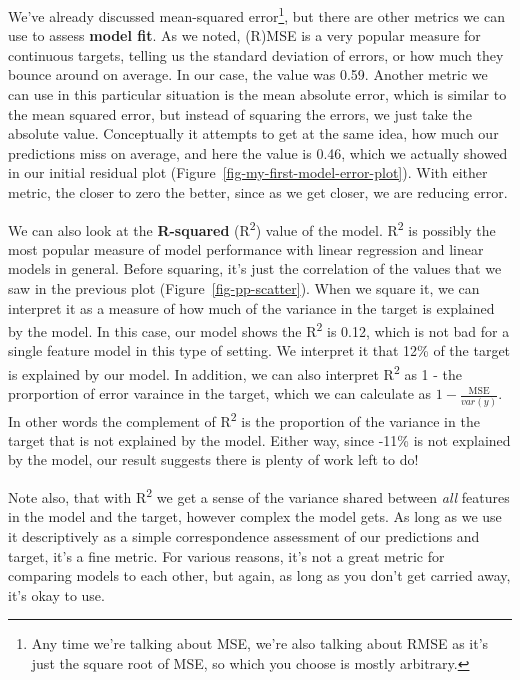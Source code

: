 \documentclass[
  letterpaper,
]{krantz}
\begin{document}
We've already discussed mean-squared error\footnote{Any time we're
  talking about MSE, we're also talking about RMSE as it's just the
  square root of MSE, so which you choose is mostly arbitrary.}, but
there are other metrics we can use to assess \textbf{model fit}. As we
noted, (R)MSE is a very popular measure for continuous targets, telling
us the standard deviation of errors, or how much they bounce around on
average. In our case, the value was 0.59. Another metric we can use in
this particular situation is the mean absolute error, which is similar
to the mean squared error, but instead of squaring the errors, we just
take the absolute value. Conceptually it attempts to get at the same
idea, how much our predictions miss on average, and here the value is
0.46, which we actually showed in our initial residual plot
(Figure~\ref{fig-my-first-model-error-plot}). With either metric, the
closer to zero the better, since as we get closer, we are reducing
error.

We can also look at the \textbf{R-squared} (R\textsuperscript{2}) value
of the model. R\textsuperscript{2} is possibly the most popular measure
of model performance with linear regression and linear models in
general. Before squaring, it's just the correlation of the values that
we saw in the previous plot (Figure~\ref{fig-pp-scatter}). When we
square it, we can interpret it as a measure of how much of the variance
in the target is explained by the model. In this case, our model shows
the R\textsuperscript{2} is 0.12, which is not bad for a single feature
model in this type of setting. We interpret it that 12\% of the target
is explained by our model. In addition, we can also interpret
R\textsuperscript{2} as 1 - the prorportion of error varaince in the
target, which we can calculate as \(1 - \frac{\textrm{MSE}}{var(y)}\).
In other words the complement of R\textsuperscript{2} is the proportion
of the variance in the target that is not explained by the model. Either
way, since -11\% is not explained by the model, our result suggests
there is plenty of work left to do!

Note also, that with R\textsuperscript{2} we get a sense of the variance
shared between \emph{all} features in the model and the target, however
complex the model gets. As long as we use it descriptively as a simple
correspondence assessment of our predictions and target, it's a fine
metric. For various reasons, it's not a great metric for comparing
models to each other, but again, as long as you don't get carried away,
it's okay to use.
\end{document}
